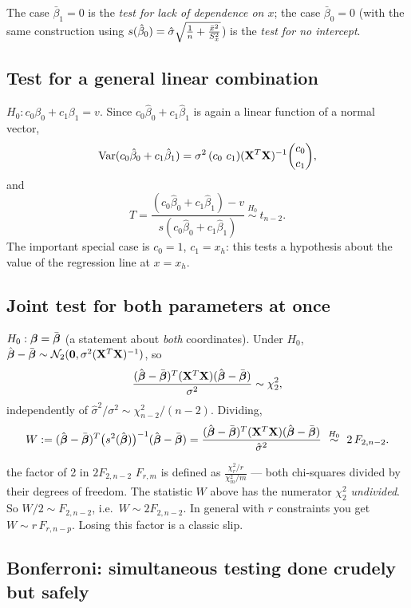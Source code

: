 \documentclass[11pt]{article}
\begin{document}
The case $\bar\beta_1 = 0$ is the \emph{test for lack of dependence on $x$}; the case
$\bar\beta_0=0$ (with the same construction using $s(\hat\beta_0)=\hat\sigma\sqrt{\frac1n+\frac{\bar{x}^2}{S_x^2}}$)
is the \emph{test for no intercept}.

\subsection{Test for a general linear combination}

$H_0:c_0\beta_0+c_1\beta_1=v$. Since $c_0\hat\beta_0+c_1\hat\beta_1$ is again a linear
function of a normal vector,
\[
  \Var(c_0\hat\beta_0+c_1\hat\beta_1)=\sigma^2\,(c_0\ c_1)(\bX^T\bX)^{-1}\binom{c_0}{c_1},
\]
and
\[
  T=\frac{(c_0\hat\beta_0+c_1\hat\beta_1)-v}{s(c_0\hat\beta_0+c_1\hat\beta_1)}
  \ \overset{H_0}{\sim}\ t_{n-2}.
\]
The important special case is $c_0=1$, $c_1=x_h$: this tests a hypothesis about the value of
the regression line at $x=x_h$.

\subsection{Joint test for both parameters at once}

$H_0:\boldsymbol{\beta}=\bar{\boldsymbol{\beta}}$ (a statement about \emph{both} coordinates). Under $H_0$,
$\hat{\boldsymbol{\beta}}-\bar{\boldsymbol{\beta}} \sim \mathcal{N}_2(\mathbf{0},\sigma^2(\mathbf{X}^T\mathbf{X})^{-1})$, so
\[
  \frac{(\hat{\boldsymbol{\beta}}-\bar{\boldsymbol{\beta}})^T(\mathbf{X}^T\mathbf{X})(\hat{\boldsymbol{\beta}}-\bar{\boldsymbol{\beta}})}{\sigma^2}\sim\chi^2_2 ,
\]
independently of $\hat\sigma^2/\sigma^2 \sim \chi^2_{n-2}/(n-2)$. Dividing,
\[
  W := (\hat{\boldsymbol{\beta}}-\bar{\boldsymbol{\beta}})^T\big(s^2(\hat{\boldsymbol{\beta}})\big)^{-1}(\hat{\boldsymbol{\beta}}-\bar{\boldsymbol{\beta}})
  = \frac{(\hat{\boldsymbol{\beta}}-\bar{\boldsymbol{\beta}})^T(\mathbf{X}^T\mathbf{X})(\hat{\boldsymbol{\beta}}-\bar{\boldsymbol{\beta}})}{\hat\sigma^2}
  \ \overset{H_0}{\sim}\ 2\,F_{2,n-2}.
\]

\begin{confusion}{the factor of 2 in $2F_{2,n-2}$}
$F_{r,m}$ is defined as $\frac{\chi^2_r/r}{\chi^2_m/m}$ --- both chi-squares divided by
their degrees of freedom. The statistic $W$ above has the numerator $\chi^2_2$
\emph{undivided}. So $W/2 \sim F_{2,n-2}$, i.e.\ $W\sim 2F_{2,n-2}$. In general with $r$
constraints you get $W \sim r\,F_{r,n-p}$. Losing this factor is a classic slip.
\end{confusion}

\subsection{Bonferroni: simultaneous testing done crudely but safely}
\end{document}
